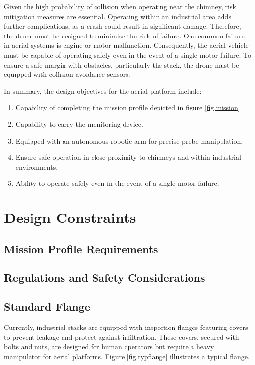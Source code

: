 \documentclass[lettersize,journal]{IEEEtran}
\begin{document}
Given the high probability of collision when operating near the chimney, risk mitigation measures are essential. Operating within an industrial area adds further complications, as a crash could result in significant damage. Therefore, the drone must be designed to minimize the risk of failure. One common failure in aerial systems is engine or motor malfunction. Consequently, the aerial vehicle must be capable of operating safely even in the event of a single motor failure. To ensure a safe margin with obstacles, particularly the stack, the drone must be equipped with collision avoidance sensors.

In summary, the design objectives for the aerial platform include:
\begin{enumerate}
\item Capability of completing the mission profile depicted in figure \ref{fig.mission}
\item Capability to carry the monitoring device.
\item Equipped with an autonomous robotic arm for precise probe manipulation.
\item Ensure safe operation in close proximity to chimneys and within industrial environments.
\item Ability to operate safely even in the event of a single motor failure.
\end{enumerate}


\section{Design Constraints}
\subsection{Mission Profile Requirements}
\subsection{Regulations and Safety Considerations}
\subsection{Standard Flange}
Currently, industrial stacks are equipped with inspection flanges featuring covers to prevent leakage and protect against infiltration. These covers, secured with bolts and nuts, are designed for human operators but require a heavy manipulator for aerial platforms. Figure \ref{fig.typflange} illustrates a typical flange.
\end{document}
